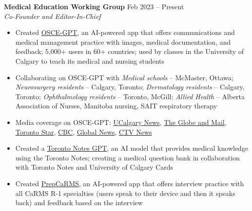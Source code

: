 \documentclass{article}
\begin{document}
\textbf{Medical Education Working Group} \hfill Feb 2023 -- Present \\
\textit{Co-Founder and Editor-In-Chief}
\begin{itemize}
    \item Created \href{https://oscegpt.com/}{OSCE-GPT}, an AI-powered app that offers communications and medical management practice with images, medical documentation, and feedback; 5,000+ users in 60+ countries; used by classes in the University of Calgary to teach its medical and nursing students
    \item Collaborating on OSCE-GPT with \textit{Medical schools} -- McMaster, Ottawa; \textit{Neurosurgery residents} -- Calgary, Toronto; \textit{Dermatology residents} -- Calgary, Toronto; \textit{Ophthalmology residents} -- Toronto, McGill; \textit{Allied Health} -- Alberta Association of Nurses, Manitoba nursing, SAIT respiratory therapy
    \item Media coverage on OSCE-GPT: \href{https://cumming.ucalgary.ca/news/ucalgary-students-create-app-help-medical-students-learn-how-talk-patients}{UCalgary News}, \href{https://www.theglobeandmail.com/canada/alberta/article-new-app-uses-ai-to-help-calgary-medical-students-practise-interacting/}{The Globe and Mail}, \href{https://www.thestar.com/news/canada/new-app-uses-ai-to-help-calgary-medical-students-practise-interacting-with-patients/article_e24a869c-58f4-58ee-99ea-666e2bc65f27.amp.html}{Toronto Star}, \href{https://www.cbc.ca/amp/1.6975645}{CBC}, \href{https://globalnews.ca/news/9978614/new-app-uses-ai-medical-students-practise-interacting-patients/}{Global News}, \href{https://calgary.ctvnews.ca/new-app-uses-ai-to-help-calgary-medical-students-practise-interacting-with-patients-1.6573065?utm_source=ground.news&utm_medium=referral}{CTV News}
    \item Created a \href{https://chat.openai.com/g/g-cewxRzfa6-toronto-notes}{Toronto Notes GPT}, an AI model that provides medical knowledge using the Toronto Notes; creating a medical question bank in collaboration with Toronto Notes and University of Calgary Cards
    \item Created \href{https://prepcarms.netlify.app/}{PrepCaRMS}, an AI-powered app that offers interview practice with all CaRMS R-1 specialties (users speak to their device and then it speaks back) and feedback based on the interview

\end{itemize}
\end{document}

